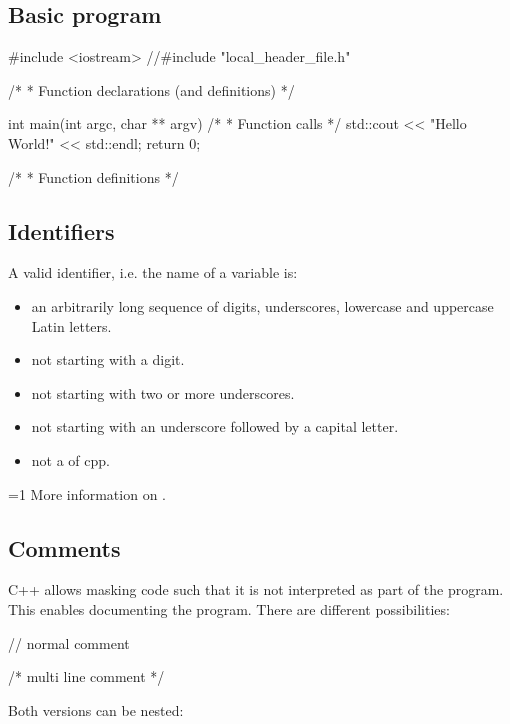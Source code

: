 \documentclass[10pt,a4paper]{scrartcl}
\gdef\conditionmacro{1}
\begin{document}
\begin{multicols*}{2}
\subsection{Basic program}

\begin{TPCpp}
#include <iostream>
//#include "local_header_file.h"

/*
 * Function declarations (and definitions)
 */

int main(int argc, char ** argv)
{
	  /*
	   * Function calls
	   */
    std::cout << "Hello World!" << std::endl;
    return 0;
}

/*
 * Function definitions
 */
\end{TPCpp}

\subsection{Identifiers}

A valid identifier, i.e. the name of a variable is:

\begin{itemize}
\item an arbitrarily long sequence of digits, underscores, lowercase and uppercase Latin letters.
\item not starting with a digit.
\item not starting with two or more underscores.
\item not starting with an underscore followed by a capital letter.
\item not a  of cpp.
\end{itemize}

\ifnum\conditionmacro=1
More information on .
\fi

\subsection{Comments}

C++ allows masking code such that it is not interpreted as part of the program. This enables documenting the program. There are different possibilities:

\begin{TPCpp}
// normal comment

/*
multi
line
comment
*/
\end{TPCpp}

Both versions can be nested:


\end{multicols*}
\end{document}
